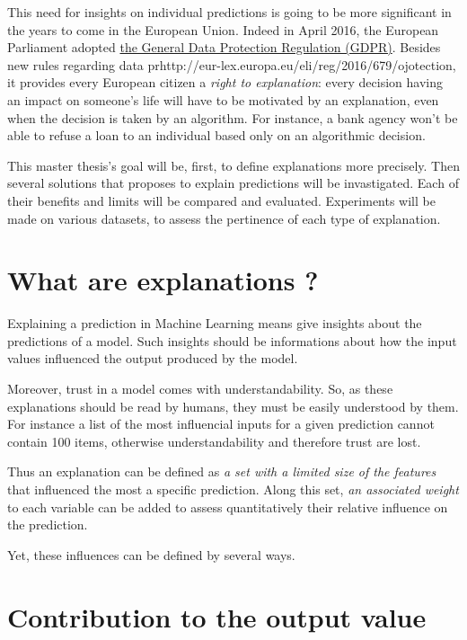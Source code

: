 \documentclass[a4paper,11pt]{kth-mag}
\begin{document}
This need for insights on individual predictions is going to be more significant in the years to come in the European Union. Indeed in April 2016, the European Parliament adopted \href{http://eur-lex.europa.eu/eli/reg/2016/679/oj}{the General Data Protection Regulation (GDPR)}. Besides new rules regarding data prhttp://eur-lex.europa.eu/eli/reg/2016/679/ojotection, it provides every European citizen a \textit{right to explanation}: every decision having an impact on someone's life will have to be motivated by an explanation, even when the decision is taken by an algorithm. For instance, a bank agency won't be able to refuse a loan to an individual based only on an algorithmic decision.

This master thesis's goal will be, first, to define explanations more precisely. Then several solutions that proposes to explain predictions will be invastigated. Each of their benefits and limits will be compared and evaluated. Experiments will be made on various datasets, to assess the pertinence of each type of explanation.

\section{What are explanations ?}

Explaining a prediction in Machine Learning means give insights about the predictions of a model. Such insights should be informations about how the input values influenced the output produced by the model. 

Moreover, trust in a model comes with understandability. So, as these explanations should be read by humans, they must be easily understood by them. For instance a list of the most influencial inputs for a given prediction cannot contain 100 items, otherwise understandability and therefore trust are lost.

Thus an explanation can be defined as \textit{a set with a limited size of the features} that influenced the most a specific prediction. Along this set, \textit{an associated weight} to each variable can be added to assess quantitatively their relative influence on the prediction.

Yet, these influences can be defined by several ways.

\section{Contribution to the output value}
\end{document}
